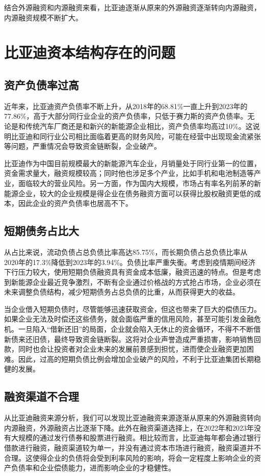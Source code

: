 结合外源融资和内源融资来看，比亚迪逐渐从原来的外源融资逐渐转向内源融资，内源融资规模不断扩大。
\section{比亚迪资本结构存在的问题}

\subsection{资产负债率过高}
近年来，比亚迪资产负债率不断上升，从2018年的68.81\%一直上升到2023年的77.86\%，高于大部分同行业企业的资产负债率，只低于赛力斯的资产负债率。无论是和传统汽车厂商还是和新兴的新能源企业相比，资产负债率均高过10\%。这说明比亚迪和同行业公司相比面临着更高的财务风险，可能在经营中出现现金流紧张等问题，严重情况会导致资金链断裂，企业破产。

比亚迪作为中国目前规模最大的新能源汽车企业，月销量处于同行业第一的位置，资金需求量大，融资规模较高；同时他也涉足多个产业，比如手机和电池制造等产业，面临较大的营业风险。另一方面，作为国内大规模，市场占有率名列前茅的新能源企业，较大的企业规模是得企业在债务融资方面可以获得比股权融资更低的成本，因此企业的资产负债率也居高不下。
\subsection{短期债务占比大}
从占比来说，流动负债占总负债比率高达85.75\%，而长期负债占总负债比率从2020年的17.3\%降低到2023年的3.94\%。负债比率严重失衡。考虑到疫情期间经济下行压力较大，使用短期负债融资具有资金成本低廉，融资迅速的特点。但是考虑到新能源企业最近竞争激烈，不断有企业通过价格战的方式抢占市场，企业必须在未来调整负债结构，减少短期债务占总负债的比重，从而获得更大的收益。

当企业借入短期负债时，尽管能够迅速获取资金，但这也带来了巨大的偿债压力。如果企业无法及时偿还这些债务，就会面临严重的信用风险，甚至可能引发金融危机。一旦陷入“借新还旧”的局面，企业就会陷入无休止的资金循环，不得不不断借新债来还旧债，最终导致资金链断裂。这将对企业声誉造成严重损害，影响销售回款，同时也会让投资者对企业未来的发展前景感到担忧，进而使企业融资更加困难。因此，过高的短期负债比例会增加企业破产的风险，不利于比亚迪集团长期稳健的发展。
\subsection{融资渠道不合理}
从比亚迪融资来源分析，我们可以发现比亚迪融资来源逐渐从原来的外源融资转向内源融资，外源融资占比逐渐下降。此外在融资渠道选择上，在2022年和2023年没有大规模的通过发行债券和股票进行融资。相比较而言，比亚迪每年都会通过银行借款进行融资，融资渠道较为单一，并没有通过资本市场进行融资，融资渠道并不合理。这使得企业的负债将会受到利率风险的影响，将会一定程度上影响企业的资产负债率和企业偿债能力，进而影响企业的才稳健性。

